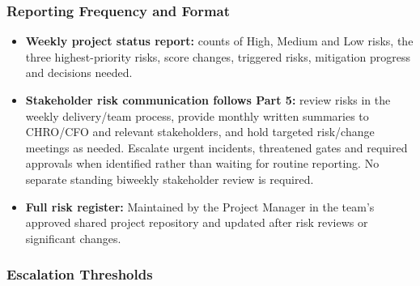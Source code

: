 \subsubsection{Reporting Frequency and Format}\label{sec:reporting-frequency-and-format}
\begin{itemize}
\item \textbf{Weekly project status report:} counts of High, Medium and Low risks, the three highest-priority risks, score changes, triggered risks, mitigation progress and decisions needed.
\item \textbf{Stakeholder risk communication follows Part 5:} review risks in the weekly delivery/\allowbreak{}team process, provide monthly written summaries to CHRO/\allowbreak{}CFO and relevant stakeholders, and hold targeted risk/\allowbreak{}change meetings as needed. Escalate urgent incidents, threatened gates and required approvals when identified rather than waiting for routine reporting. No separate standing biweekly stakeholder review is required.
\item \textbf{Full risk register:} Maintained by the Project Manager in the team's approved shared project repository and updated after risk reviews or significant changes.
\end{itemize}


\clearpage
\subsubsection{Escalation Thresholds}\label{sec:escalation-thresholds}

